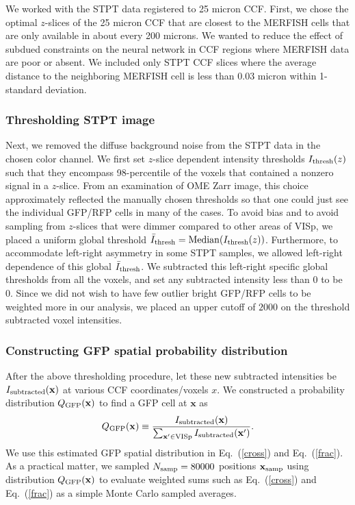 \documentclass{article}
\newcommand\beq{\begin{equation}}
\newcommand\eeq[1]{\label{#1}\end{equation}}
\newcommand\eqn[1]{Eq.\ (\ref{#1})}
\begin{document}
We worked with the STPT data registered to 25 micron CCF.  First,
we chose the optimal $z$-slices of the 25 micron CCF that are closest
to the MERFISH cells that are only available in about every 200
microns.  We wanted to reduce the effect of subdued constraints on
the neural network in CCF regions where MERFISH data are poor or
absent. We included only STPT CCF slices where the average distance
to the neighboring MERFISH cell is less than 0.03 micron within
1-standard deviation.

\subsubsection{Thresholding STPT image}

Next, we removed the diffuse background noise from the STPT data
in the chosen color channel.  We first set $z$-slice dependent
intensity thresholds $I_{\rm thresh}(z)$ such that they encompass
98-percentile of the voxels that contained a nonzero signal in a
$z$-slice. From an examination of OME Zarr image, this choice
approximately reflected the manually chosen thresholds so that one
could just see the individual GFP/RFP cells in many of the cases.
To avoid bias and to avoid sampling from $z$-slices that were dimmer
compared to other areas of VISp, we placed a uniform global threshold
$\bar I_{\rm thresh} = {\rm Median}( I_{\rm thresh}(z) )$. 
Furthermore,
to accommodate left-right asymmetry in some STPT samples, we allowed 
left-right dependence of this global $\bar I_{\rm thresh}$. 
We subtracted this left-right specific global thresholds from all the voxels, 
and set any subtracted intensity less than 0 to be 0.
Since
we did not wish to have few outlier bright GFP/RFP cells to 
be weighted more in our analysis, we placed an upper cutoff of 
$2000$ on the threshold subtracted voxel intensities. 

\subsubsection{Constructing GFP spatial probability distribution}
After the above
thresholding procedure, let these new subtracted intensities be 
$I_{\rm subtracted}(\mathbf{x})$ at various CCF coordinates/voxels $x$. We constructed a 
probability distribution $Q_{\rm GFP}(\mathbf{x})$ to find a GFP cell at $\mathbf{x}$ as 
\beq
Q_{\rm GFP}(\mathbf{x}) \equiv \frac{I_{\rm subtracted}(\mathbf{x})}{ \sum_{\mathbf{x'}\in \text{VISp}} I_{\rm subtracted}(\mathbf{x'}) }. 
\eeq{qxdef}
We use this estimated GFP spatial distribution in \eqn{cross} and
\eqn{frac}. As a practical matter, we sampled $N_{\rm samp} = 80000$ positions
$\mathbf{x}_{\rm samp}$ using distribution $Q_{\rm GFP}(\mathbf{x})$ to evaluate 
weighted sums such as \eqn{cross} and \eqn{frac} as a simple Monte Carlo sampled 
averages.
\end{document}
